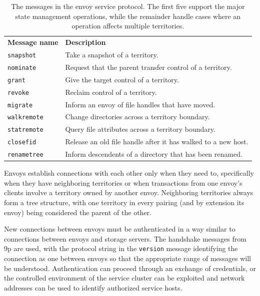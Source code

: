 \begin{table}[tp]
\begin{center}
\begin{tabular}{lp{8cm}}
\textbf{Message name} & \textbf{Description} \\
\texttt{snapshot} & Take a snapshot of a territory. \\
\texttt{nominate} & Request that the parent transfer control of a territory. \\
\texttt{grant} & Give the target control of a territory. \\
\texttt{revoke} & Reclaim control of a territory. \\
\texttt{migrate} & Inform an envoy of file handles that have moved. \\
\texttt{walkremote} & Change directories across a territory boundary. \\
\texttt{statremote} & Query file attributes across a territory boundary. \\
\texttt{closefid} & Release an old file handle after it has walked to a new host. \\
\texttt{renametree} & Inform descendents of a directory that has been renamed.
\end{tabular}
\end{center}
\caption[Additional messages in the envoy service protocol]{The messages in the envoy service protocol. The first five support the major state management operations, while the remainder handle cases where an operation affects multiple territories.}
\label{tab:envoy-messages}
\end{table}

Envoys establish connections with each other only when they need to, specifically when they have neighboring territories or when transactions from one envoy's clients involve a territory owned by another envoy. Neighboring territories always form a tree structure, with one territory in every pairing (and by extension its envoy) being considered the parent of the other.

New connections between envoys must be authenticated in a way similar to connections between envoys and storage servers. The handshake messages from 9p are used, with the protocol string in the \texttt{version} message identifying the connection as one between envoys so that the appropriate range of messages will be understood. Authentication can proceed through an exchange of credentials, or the controlled environment of the service cluster can be exploited and network addresses can be used to identify authorized service hosts.

